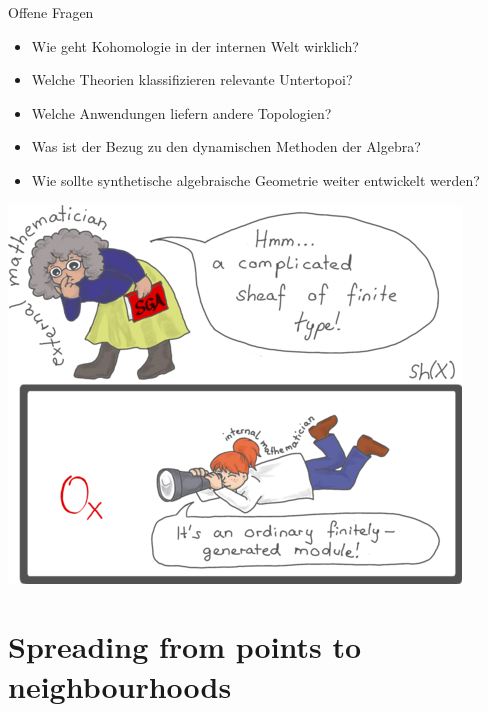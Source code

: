 \documentclass[12pt,utf8,notheorems,compress,t]{beamer}
\renewcommand{\_}{\mathpunct{.}}
\newcommand{\?}{\,{:}\,}
\newcounter{framenumberpreappendix}
\newcommand{\backupstart}{
  \setcounter{framenumberpreappendix}{\value{framenumber}}
}
\newcommand{\backupend}{
  \addtocounter{framenumberpreappendix}{-\value{framenumber}}
  \addtocounter{framenumber}{\value{framenumberpreappendix}} 
}
\begin{document}
\begin{frame}{Offene Fragen}
  \begin{itemize}
    \small
    \item Wie geht Kohomologie in der internen Welt wirklich?
    \item Welche Theorien klassifizieren relevante Untertopoi?
    \item Welche Anwendungen liefern andere Topologien?
    \item Was ist der Bezug zu den dynamischen Methoden der Algebra?
    \item Wie sollte synthetische algebraische Geometrie weiter entwickelt
    werden?
  \end{itemize}

  {\vspace{-0.1em}\centering
  \hspace{-0.05cm}%
  \includegraphics[scale=0.28]{images/external-internal-small}
  \par\medskip\vspace{-0.1em}}
\end{frame}

\backupend

\backupstart


\appendix


\section{Spreading from points to neighbourhoods}
\end{document}
